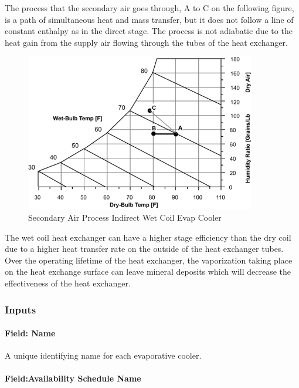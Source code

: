 The process that the secondary air goes through, A to C on the following figure, is a path of simultaneous heat and mass transfer, but it does not follow a line of constant enthalpy as in the direct stage. The process is not adiabatic due to the heat gain from the supply air flowing through the tubes of the heat exchanger.

\begin{figure}[hbtp] %
\centering
\includegraphics[width=0.9\textwidth, height=0.9\textheight, keepaspectratio=true]{media/image422.png}
\caption{Secondary Air Process Indirect Wet Coil Evap Cooler \protect \label{fig:secondary-air-process-indirect-wet-coil-evap}}
\end{figure}

The wet coil heat exchanger can have a higher stage efficiency than the dry coil due to a higher heat transfer rate on the outside of the heat exchanger tubes. Over the operating lifetime of the heat exchanger, the vaporization taking place on the heat exchange surface can leave mineral deposits which will decrease the effectiveness of the heat exchanger.

\subsubsection{Inputs}\label{inputs-3-012}

\paragraph{Field: Name}\label{field-name-3-011}

A unique identifying name for each evaporative cooler.

\paragraph{Field:Availability Schedule Name}\label{fieldavailability-schedule-name-2}

